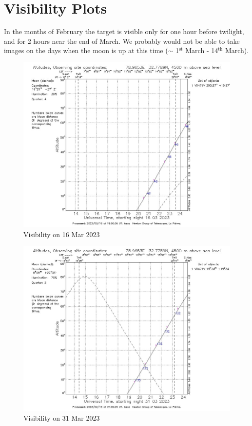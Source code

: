 \documentclass[12pt]{article}
\begin{document}
\section{Visibility Plots}
In the months of February the target is visible only for one hour before twilight, and for 2 hours near the end of March. We probably would not be able to take images on the days when the moon is up at this time ($\sim$ 1$^\text{st}$ March - 14$^\text{th}$ March).
\begin{figure}[H]
    \centering
    \includegraphics[width=14cm]{16march_visibility.jpg}
    \caption{Visibility on 16 Mar 2023}
    \label{fig:fig1}
\end{figure}
\begin{figure}[H]
    \centering
    \includegraphics[width=14cm]{31march_visibility.jpg}
    \caption{Visibility on 31 Mar 2023}
    \label{fig:fig2}
\end{figure}

\end{document}

